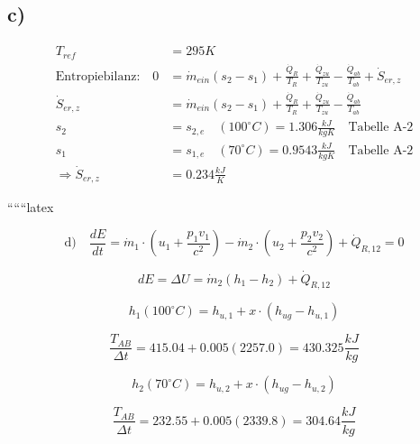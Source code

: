 

\subsection*{c)}
\begin{align*}
T_{ref} &= 295 K \\
\text{Entropiebilanz:} \quad 0 &= \dot{m}_{ein} (s_2 - s_1) + \frac{\dot{Q}_R}{T_R} + \frac{\dot{Q}_{zu}}{T_{zu}} - \frac{\dot{Q}_{ab}}{T_{ab}} + \dot{S}_{er, z} \\
\dot{S}_{er, z} &= \dot{m}_{ein} (s_2 - s_1) + \frac{\dot{Q}_R}{T_R} + \frac{\dot{Q}_{zu}}{T_{zu}} - \frac{\dot{Q}_{ab}}{T_{ab}} \\
s_2 &= s_{2,e} \quad (100^\circ C) = 1.306 \frac{kJ}{kgK} \quad \text{Tabelle A-2} \\
s_1 &= s_{1,e} \quad (70^\circ C) = 0.9543 \frac{kJ}{kgK} \quad \text{Tabelle A-2} \\
\Rightarrow \dot{S}_{er, z} &= 0.234 \frac{kJ}{K}
\end{align*}

``````latex


\begin{equation*}
\text{d)} \quad \frac{dE}{dt} = \dot{m}_1 \cdot \left( u_1 + \frac{p_1 v_1}{c^2} \right) - \dot{m}_2 \cdot \left( u_2 + \frac{p_2 v_2}{c^2} \right) + \dot{Q}_{R,12} = 0
\end{equation*}

\begin{equation*}
dE = \Delta U = \dot{m}_2 \left( h_1 - h_2 \right) + \dot{Q}_{R,12}
\end{equation*}

\begin{equation*}
h_1 (100^\circ C) = h_{u,1} + x \cdot \left( h_{ug} - h_{u,1} \right)
\end{equation*}

\begin{equation*}
\frac{T_{AB}}{\Delta t} = 415.04 + 0.005 \left( 2257.0 \right) = 430.325 \frac{kJ}{kg}
\end{equation*}

\begin{equation*}
h_2 (70^\circ C) = h_{u,2} + x \cdot \left( h_{ug} - h_{u,2} \right)
\end{equation*}

\begin{equation*}
\frac{T_{AB}}{\Delta t} = 232.55 + 0.005 \left( 2339.8 \right) = 304.64 \frac{kJ}{kg}
\end{equation*}

